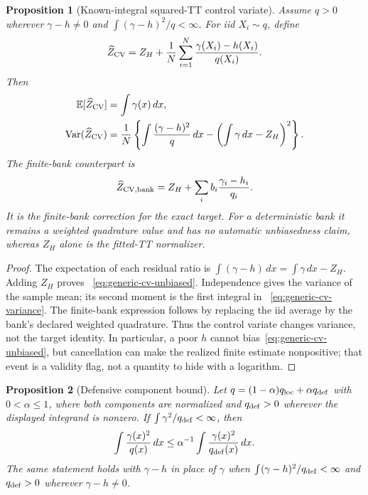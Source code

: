 \documentclass[11pt]{article}
\newtheorem{proposition}{Proposition}
\begin{document}
\begin{proposition}[Known-integral squared-TT control variate]
\label{prop:generic-control-variate}
Assume $q>0$ wherever $\gamma-h\neq0$ and
$\int(\gamma-h)^2/q<\infty$. For iid $X_i\sim q$, define
\begin{equation}\label{eq:generic-cv-estimator}
  \widehat Z_{\rm CV}=Z_H+\frac1N\sum_{i=1}^N
       \frac{\gamma(X_i)-h(X_i)}{q(X_i)}.
\end{equation}
Then
\begin{align}
  \mathbb E[\widehat Z_{\rm CV}]&=\int\gamma(x)\,dx,
       \label{eq:generic-cv-unbiased}\\
  \operatorname{Var}(\widehat Z_{\rm CV})
    &=\frac1N\left\{\int\frac{(\gamma-h)^2}{q}\,dx
       -\left(\int\gamma\,dx-Z_H\right)^2\right\}.
       \label{eq:generic-cv-variance}
\end{align}
The finite-bank counterpart is
\begin{equation}\label{eq:generic-finite-cv}
  \widehat Z_{\rm CV,bank}=Z_H+\sum_i b_i
       \frac{\gamma_i-h_i}{q_i}.
\end{equation}
It is the finite-bank correction for the exact target. For a deterministic bank
it remains a weighted quadrature value and has no automatic unbiasedness claim,
whereas $Z_H$ alone is the fitted-TT normalizer.
\end{proposition}

\begin{proof}
The expectation of each residual ratio is
$\int(\gamma-h)\,dx=\int\gamma\,dx-Z_H$. Adding $Z_H$ proves
~\eqref{eq:generic-cv-unbiased}. Independence gives the variance of the
sample mean; its second moment is the first integral in
~\eqref{eq:generic-cv-variance}. The finite-bank expression follows by
replacing the iid average by the bank's declared weighted quadrature. Thus the
control variate changes variance, not the target identity. In particular, a
poor $h$ cannot bias~\eqref{eq:generic-cv-unbiased}, but cancellation can make
the realized finite estimate nonpositive; that event is a validity flag, not a
quantity to hide with a logarithm.
\end{proof}

\begin{proposition}[Defensive component bound]
\label{prop:generic-defensive}
Let $q=(1-\alpha)q_{\rm loc}+\alpha q_{\rm def}$ with
$0<\alpha\leq1$, where both components are normalized and
$q_{\rm def}>0$ wherever the displayed integrand is nonzero. If
$\int\gamma^2/q_{\rm def}<\infty$, then
\begin{equation}\label{eq:generic-defensive-bound}
  \int\frac{\gamma(x)^2}{q(x)}\,dx
  \leq \alpha^{-1}\int\frac{\gamma(x)^2}{q_{\rm def}(x)}\,dx.
\end{equation}
The same statement holds with $\gamma-h$ in place of $\gamma$ when
$\int(\gamma-h)^2/q_{\rm def}<\infty$ and $q_{\rm def}>0$ wherever
$\gamma-h\neq0$.
\end{proposition}
\end{document}

